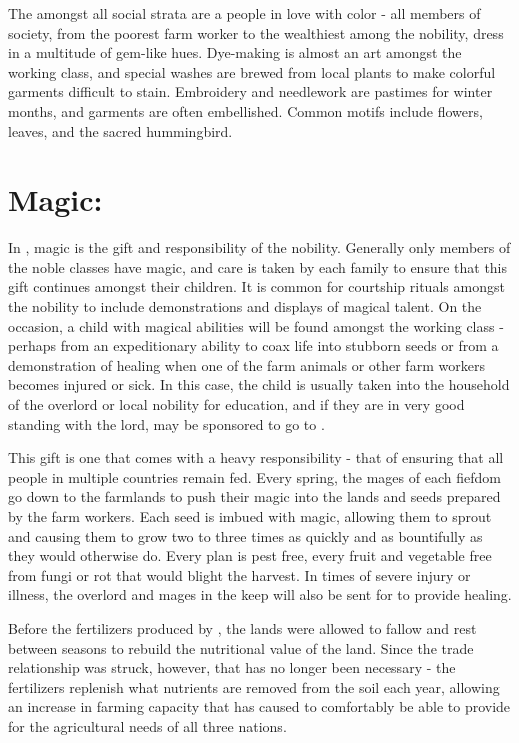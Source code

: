 \documentclass[blue]{GL2020}
\begin{document}
The \pSunCh{} amongst all social strata are a people in love with color - all members of society, from the poorest farm worker to the wealthiest among the nobility, dress in a multitude of gem-like hues.  Dye-making is almost an art amongst the working class, and special washes are brewed from local plants to make colorful garments difficult to stain.  Embroidery and needlework are pastimes for winter months, and garments are often embellished.  Common motifs include flowers, leaves, and the sacred hummingbird.

\section*{Magic:}

In \pSun{}, magic is the gift and responsibility of the nobility. Generally only members of the noble classes have magic, and care is taken by each family to ensure that this gift continues amongst their children.  It is common for courtship rituals amongst the nobility to include demonstrations and displays of magical talent.  On the occasion, a child with magical abilities will be found amongst the working class - perhaps from an expeditionary ability to coax life into stubborn seeds or from a demonstration of healing when one of the farm animals or other farm workers becomes injured or sick.  In this case, the child is usually taken into the household of the overlord or local nobility for education, and if they are in very good standing with the lord, may be sponsored to go to \pSchool{}.

This gift is one that comes with a heavy responsibility - that of ensuring that all people in multiple countries remain fed.  Every spring, the mages of each fiefdom go down to the farmlands to push their magic into the lands and seeds prepared by the farm workers.  Each seed is imbued with magic, allowing them to sprout and causing them to grow two to three times as quickly and as bountifully as they would otherwise do.  Every plan is pest free, every fruit and vegetable free from fungi or rot that would blight the harvest.  In times of severe injury or illness, the overlord and mages in the keep will also be sent for to provide healing.   

Before the fertilizers produced by \pCreators{}, the lands were allowed to fallow and rest between seasons to rebuild the nutritional value of the land.  Since the trade relationship was struck, however, that has no longer been necessary - the fertilizers replenish what nutrients are removed from the soil each year, allowing an increase in farming capacity that has caused \pSun{} to comfortably be able to provide for the agricultural needs of all three nations.
\end{document}
